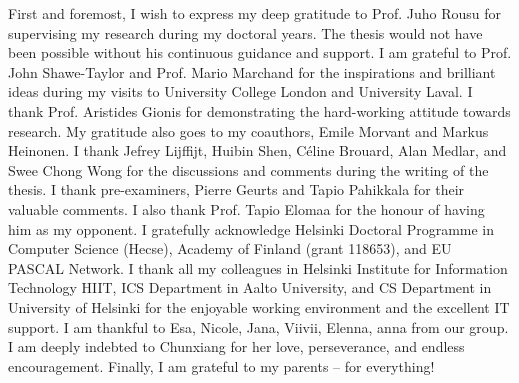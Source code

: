 

\begin{preface}[Espoo]

%
First and foremost, I wish to express my deep gratitude to Prof. Juho Rousu for supervising my research during my doctoral years.
The thesis would not have been possible without his continuous guidance and support. 
%
I am grateful to Prof. John Shawe-Taylor and Prof. Mario Marchand for the inspirations and brilliant ideas during my visits to University College London and University Laval.
%
I thank Prof. Aristides Gionis for demonstrating the hard-working attitude towards research.
My gratitude also goes to my coauthors, Emile Morvant and Markus Heinonen. 
%
I thank Jefrey Lijffijt, Huibin Shen, C\'eline Brouard, Alan Medlar, and Swee Chong Wong for the discussions and comments during the writing of the thesis.
I thank pre-examiners, Pierre Geurts and Tapio Pahikkala for their valuable comments.
I also thank Prof. Tapio Elomaa for the honour of having him as my opponent.
%
I gratefully acknowledge Helsinki Doctoral Programme in Computer Science (Hecse), Academy of Finland (grant 118653), and EU PASCAL Network.
% 
I thank all my colleagues in Helsinki Institute for Information Technology HIIT, ICS Department in Aalto University, and CS Department in University of Helsinki for the enjoyable working environment and the excellent IT support.
%
I am thankful to Esa, Nicole, Jana, Viivii, Elenna, anna from our group.
%
%
I am deeply indebted to Chunxiang for her love, perseverance, and endless encouragement.
%
Finally, I am grateful to my parents -- for everything!


\end{preface}

